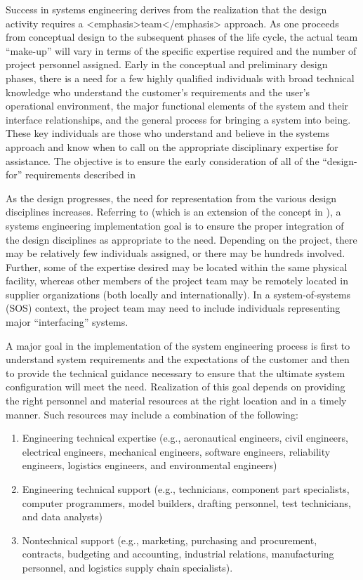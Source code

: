 Success in systems engineering derives from the realization that the design activity requires a <emphasis>team</emphasis> approach. As one proceeds from conceptual design to the subsequent phases of the life cycle, the actual team ``make-up'' will vary in terms of the specific expertise required and the number of project personnel assigned. Early in the conceptual and preliminary design phases, there is a need for a few highly qualified individuals with broad technical knowledge who understand the customer’s requirements and the user’s operational environment, the major functional elements of the system and their interface relationships, and the general process for bringing a system into being. These key individuals are those who understand and believe in the systems approach and know when to call on the appropriate disciplinary expertise for assistance. The objective is to ensure the early consideration of all of the ``design-for'' requirements described in 

As the design progresses, the need for representation from the various design disciplines increases. Referring to (which is an extension of the concept in ), a systems engineering implementation goal is to ensure the proper integration of the design disciplines as appropriate to the need. Depending on the project, there may be relatively few individuals assigned, or there may be hundreds involved. Further, some of the expertise desired may be located within the same physical facility, whereas other members of the project team may be remotely located in supplier organizations (both locally and internationally). In a system-of-systems (SOS) context, the project team may need to include individuals representing major “interfacing” systems.

A major goal in the implementation of the system engineering process is first to understand system requirements and the expectations of the customer and then to provide the technical guidance necessary to ensure that the ultimate system configuration will meet the need. Realization of this goal depends on providing the right personnel and material resources at the right location and in a timely manner. Such resources may include a combination of the following:	

\begin{enumerate}
\item Engineering technical expertise (e.g., aeronautical engineers, civil engineers, electrical engineers, mechanical engineers, software engineers, reliability engineers, logistics engineers, and environmental engineers)
\item Engineering technical support (e.g., technicians, component part specialists, computer programmers, model builders, drafting personnel, test technicians, and data analysts)
\item Nontechnical support (e.g., marketing, purchasing and procurement, contracts, budgeting and accounting, industrial relations, manufacturing personnel, and logistics supply chain specialists). 
\end{enumerate}

